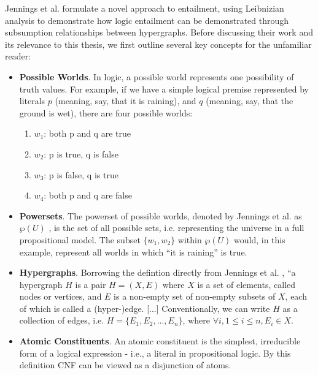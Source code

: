 \documentclass[12pt,twoside]{report}
\begin{document}
Jennings et al. \cite{leibnizianAnalysis} formulate a novel approach to entailment, using Leibnizian analysis to demonstrate how logic entailment can be demonstrated through subsumption relationships between hypergraphs. Before discussing their work and its relevance to this thesis, we first outline several key concepts for the unfamiliar reader: \newline
\begin{itemize}
    \item \textbf{Possible Worlds}. In logic, a possible world represents one possibility of truth values. For example, if we have a simple logical premise represented by literals $p$ (meaning, say, that it is raining), and $q$ (meaning, say, that the ground is wet), there are four possible worlds:
    \begin{enumerate}
        \item $w_1$: both p and q are true
        \item $w_2$: p is true, q is false
        \item $w_3$: p is false, q is true
        \item $w_4$: both p and q are false
    \end{enumerate}
    \item \textbf{Powersets}. The powerset of possible worlds, denoted by Jennings et al. as $\wp(U)$ \cite{leibnizianAnalysis}, is the set of all possible sets, i.e. representing the universe in a full propositional model. The subset $\{w_1, w_2\}$ within $\wp(U)$ would, in this example, represent all worlds in which ``it is raining'' is true. 
    \item \textbf{Hypergraphs}. Borrowing the defintion directly from Jennings et al. \cite{leibnizianAnalysis}, ``a hypergraph $H$ is a pair $H=(X, E)$ where $X$ is a set of elements, called nodes or vertices, and $E$ is a non-empty set of non-empty subsets of $X$, each of which is called a (hyper-)edge. [...] Conventionally, we can write $H$ as a collection of edges, i.e. $H=\{E_1, E_2, ..., E_n\}$, where $\forall i, 1 \leq i \leq n, E_i \in X$. 
    \item \textbf{Atomic Constituents}. An atomic constituent is the simplest, irreducible form of a logical expression - i.e., a literal in propositional logic. By this definition CNF can be viewed as a disjunction of atoms.
\end{itemize}
\end{document}

